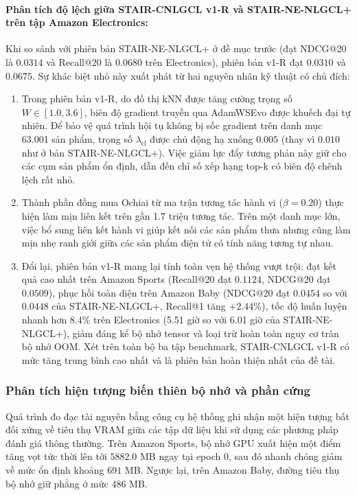 \paragraph{Phân tích độ lệch giữa STAIR-CNLGCL v1-R và STAIR-NE-NLGCL+ trên tập Amazon Electronics:}
Khi so sánh với phiên bản STAIR-NE-NLGCL+ ở đề mục trước (đạt NDCG@20 là $0.0314$ và Recall@20 là $0.0680$ trên Electronics), phiên bản v1-R đạt $0.0310$ và $0.0675$. Sự khác biệt nhỏ này xuất phát từ hai nguyên nhân kỹ thuật có chủ đích:
\begin{enumerate}[leftmargin=*]
    \item Trong phiên bản v1-R, do đồ thị kNN được tăng cường trọng số $W \in [1.0, 3.6]$, biên độ gradient truyền qua AdamWSEvo được khuếch đại tự nhiên. Để bảo vệ quá trình hội tụ không bị sốc gradient trên danh mục 63.001 sản phẩm, trọng số $\lambda_{\text{cl}}$ được chủ động hạ xuống $0.005$ (thay vì $0.010$ như ở bản STAIR-NE-NLGCL+). Việc giảm lực đẩy tương phản này giữ cho các cụm sản phẩm ổn định, dẫn đến chỉ số xếp hạng top-k có biên độ chênh lệch rất nhỏ.
    \item Thành phần đồng mua Ochiai từ ma trận tương tác hành vi ($\beta = 0.20$) thực hiện làm mịn liên kết trên gần 1.7 triệu tương tác. Trên một danh mục lớn, việc bổ sung liên kết hành vi giúp kết nối các sản phẩm thưa nhưng cũng làm mịn nhẹ ranh giới giữa các sản phẩm điện tử có tính năng tương tự nhau.
    \item Đổi lại, phiên bản v1-R mang lại tính toàn vẹn hệ thống vượt trội: đạt kết quả cao nhất trên Amazon Sports (Recall@20 đạt $0.1124$, NDCG@20 đạt $0.0509$), phục hồi toàn diện trên Amazon Baby (NDCG@20 đạt $0.0454$ so với $0.0448$ của STAIR-NE-NLGCL+, Recall@1 tăng $+2.44\%$), tốc độ huấn luyện nhanh hơn 8.4\% trên Electronics (5.51 giờ so với 6.01 giờ của STAIR-NE-NLGCL+), giảm đáng kể bộ nhớ tensor và loại trừ hoàn toàn nguy cơ tràn bộ nhớ OOM. Xét trên toàn bộ ba tập benchmark, STAIR-CNLGCL v1-R có mức tăng trung bình cao nhất và là phiên bản hoàn thiện nhất của đề tài.
\end{enumerate}

\subsubsection{Phân tích hiện tượng biến thiên bộ nhớ và phần cứng}

Quá trình đo đạc tài nguyên bằng công cụ hệ thống ghi nhận một hiện tượng bất đối xứng về tiêu thụ VRAM giữa các tập dữ liệu khi sử dụng các phương pháp đánh giá thông thường. Trên Amazon Sports, bộ nhớ GPU xuất hiện một điểm tăng vọt tức thời lên tới $5882.0$ MB ngay tại epoch 0, sau đó nhanh chóng giảm về mức ổn định khoảng $691$ MB. Ngược lại, trên Amazon Baby, đường tiêu thụ bộ nhớ giữ phẳng ở mức $486$ MB.

